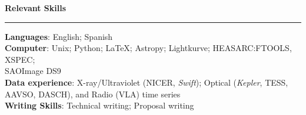 \documentclass[12pt]{article}
\begin{document}
\newpage
\noindent
{\bf Relevant Skills} \\
\vspace{-10mm}
\begin{center}
\rule{\textwidth}{0.2mm}
\end{center}
\vspace{-3mm}
\noindent
\textbf{Languages}: English; Spanish\\
\textbf{Computer}: Unix; Python; LaTeX; Astropy; Lightkurve; HEASARC:FTOOLS, XSPEC; \\ SAOImage DS9 \\
\textbf{Data experience}: X-ray/Ultraviolet (NICER, {\it Swift}); Optical ({\it Kepler}, TESS, AAVSO, DASCH), and Radio (VLA) time series \\
\textbf{Writing Skills}: Technical writing; Proposal writing \\
\end{document}
